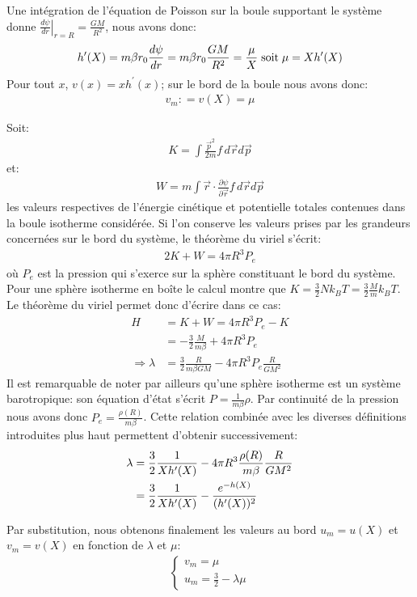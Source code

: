 	Une intégration de l'équation de Poisson sur la boule supportant le système donne $\left.\frac{d \psi}{dr}
	\right|_{r=R}= \frac{GM}{R^2}$, nous avons donc:
	\begin{align*}
		h'(X) = m\beta r_0 \frac{d \psi}{dr} = m\beta r_0 \frac{GM}{R^2} = \frac{\mu}{X} \;\textrm{soit}\; \mu = Xh'(X)
	\end{align*}
	Pour tout $x$, $v(x)=xh^{\prime}(x)$; sur le bord de la boule nous avons donc:
	\begin{align}
		 v_m: = v\left(X\right) = \mu\label{vmmu}
	\end{align}

	Soit:
	\begin{align*}K=\int \frac{\vec{p}^2}{2m}f\, d\vec{r}d\vec{p}\end{align*}
		et:
	\begin{align*}W=m\int \vec{r}\cdot \frac{\partial \psi}{\partial \vec{r}}f\, d\vec{r}d\vec{p}\end{align*}
	les valeurs respectives de l'énergie cinétique et potentielle totales contenues dans la boule isotherme considérée. Si l'on conserve les valeurs prises par les grandeurs concernées sur le bord du système, le théorème du viriel  s'écrit:
	\begin{align}
		2K + W = 4\pi R^3 P_e \label{virielinabox}
	\end{align}
	 où $P_e$ est la pression qui s'exerce sur la sphère constituant le bord du système.
	Pour une sphère isotherme en boîte  le calcul montre que \mbox{$K = \frac{3}{2} N k_B T = \frac{3}{2} \frac{M}{m} k_B T$}. Le théorème du
	viriel permet donc d'écrire dans ce cas:
	\begin{align*}
		H &= K + W =  4\pi R^3 P_e - K \\
		  &= -\frac{3}{2} \frac{M}{m\beta} + 4\pi R^3 P_e \\
		\Rightarrow \lambda &= \frac{3}{2}\frac{R}{m\beta GM} - 4\pi R^3 P_e \frac{R}{GM^2}
	\end{align*}
	Il est remarquable de noter par ailleurs qu'une sphère isotherme est un système barotropique: son équation d'état s'écrit
	$P=\frac{1}{m\beta}\rho$. Par continuité de la pression nous avons donc $P_e = \frac{\rho(R)}{m\beta}$. Cette relation combinée avec les
	diverses définitions introduites plus haut permettent d'obtenir successivement:
	\begin{align}
		\lambda &= \frac{3}{2}\frac{1}{Xh'(X)} - 4\pi R^3 \frac{\rho(R)}{m\beta} \frac{R}{GM^2} \notag \\
			&= \frac{3}{2}\frac{1}{Xh'(X)} - \frac{e^{-h(X)}}{(h'(X))^2}\label{lamum}
	\end{align}

	Par substitution, nous obtenons finalement les valeurs au bord $u_m=u(X)$ et $v_m=v(X)$ en fonction de $\lambda$ et $\mu$:
	\begin{align}
		\label{uv_max}
		\left\{\begin{array}{l}
			v_m = \mu \\
			u_m = \frac{3}{2} - \lambda \mu
		\end{array}\right.
	\end{align}

